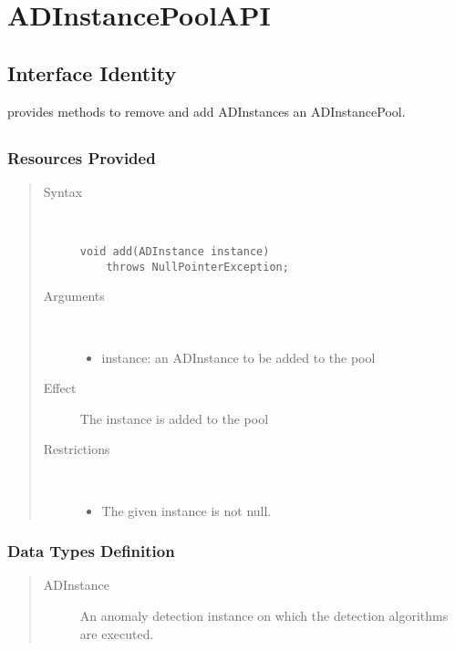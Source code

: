 \section{ADInstancePoolAPI}
\label{api:ad-instance-pool-api}

\subsection{Interface Identity}

\npar {} provides methods to remove and add
ADInstances an ADInstancePool.

\subsection{}

\subsubsection{Resources Provided}

\begin{quote}
	\begin{description}
		\item[Syntax] \ 
		\begin{verbatim}
void add(ADInstance instance) 
    throws NullPointerException;
		\end{verbatim}
		\item[Arguments] \
		\begin{itemize}
			\item instance: an ADInstance to be added to the pool
		\end{itemize}
		\item[Effect] The instance is added to the pool
		\item[Restrictions] \ 
		\begin{itemize}
			\item The given instance is not null.
		\end{itemize}
	\end{description} 
\end{quote}

\subsubsection{Data Types Definition}

\begin{quote}
	\begin{description}
		\item[ADInstance] An anomaly detection instance on which the
		detection algorithms are executed.
	\end{description} 
\end{quote}

